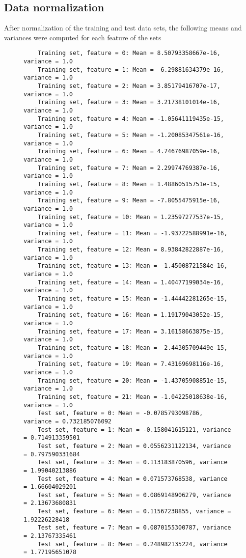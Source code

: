 \documentclass[a4paper]{article}
\begin{document}
\subsection{Data normalization}
After normalization of the training and test data sets, the following means and variances were computed for each feature of the sets
\begin{figure}[H]
	\begin{lstlisting}
	Training set, feature = 0: Mean = 8.50793358667e-16, variance = 1.0
	Training set, feature = 1: Mean = -6.29881634379e-16, variance = 1.0
	Training set, feature = 2: Mean = 3.85179416707e-17, variance = 1.0
	Training set, feature = 3: Mean = 3.21738101014e-16, variance = 1.0
	Training set, feature = 4: Mean = -1.05641119435e-15, variance = 1.0
	Training set, feature = 5: Mean = -1.20085347561e-16, variance = 1.0
	Training set, feature = 6: Mean = 4.74676987059e-16, variance = 1.0
	Training set, feature = 7: Mean = 2.29974769387e-16, variance = 1.0
	Training set, feature = 8: Mean = 1.48860515751e-15, variance = 1.0
	Training set, feature = 9: Mean = -7.8055475915e-16, variance = 1.0
	Training set, feature = 10: Mean = 1.23597277537e-15, variance = 1.0
	Training set, feature = 11: Mean = -1.93722588991e-16, variance = 1.0
	Training set, feature = 12: Mean = 8.93842822887e-16, variance = 1.0
	Training set, feature = 13: Mean = -1.45008721584e-16, variance = 1.0
	Training set, feature = 14: Mean = 1.40477199034e-16, variance = 1.0
	Training set, feature = 15: Mean = -1.44442281265e-15, variance = 1.0
	Training set, feature = 16: Mean = 1.19179043052e-15, variance = 1.0
	Training set, feature = 17: Mean = 3.16158663875e-15, variance = 1.0
	Training set, feature = 18: Mean = -2.44305709449e-15, variance = 1.0
	Training set, feature = 19: Mean = 7.43169698116e-16, variance = 1.0
	Training set, feature = 20: Mean = -1.43705908851e-15, variance = 1.0
	Training set, feature = 21: Mean = -1.04225018638e-16, variance = 1.0
	Test set, feature = 0: Mean = -0.0785793098786, variance = 0.732185076092
	Test set, feature = 1: Mean = -0.158041615121, variance = 0.714913359501
	Test set, feature = 2: Mean = 0.0556231122134, variance = 0.797590331684
	Test set, feature = 3: Mean = 0.113183870596, variance = 1.99040213886
	Test set, feature = 4: Mean = 0.071573768538, variance = 1.66604029201
	Test set, feature = 5: Mean = 0.0869148906279, variance = 2.13673680831
	Test set, feature = 6: Mean = 0.11567238855, variance = 1.92226228418
	Test set, feature = 7: Mean = 0.0870155300787, variance = 2.13767335461
	Test set, feature = 8: Mean = 0.248982135224, variance = 1.77195651078	

\end{lstlisting}
\end{figure}
\end{document}
